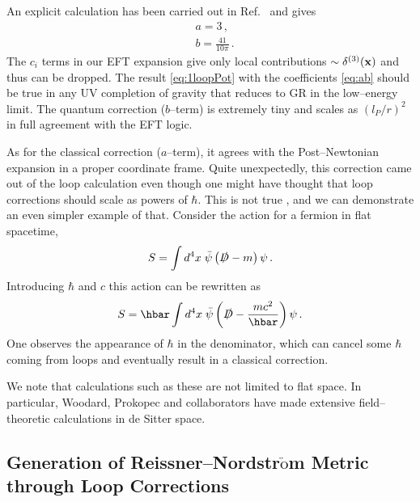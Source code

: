 \documentclass[11pt,a4paper]{article}
\newcommand{\be}{\begin{equation}}
\newcommand{\ee}{\end{equation}}
\begin{document}
An explicit calculation has been carried out in Ref.~\cite{Donoghue:1994dn} and gives
\be
\label{eq:ab}
 \begin{split}
& a=3\,,\\
& b=\frac{41}{10\pi}\,.
\end{split}
\ee
The $c_i$ terms in our EFT expansion give only local contributions $\sim \delta^{(3)}(\bf{x})$
and thus can be dropped.
The result \eqref{eq:1loopPot} with the coefficients \eqref{eq:ab} should be true in any
UV completion of gravity that reduces to GR in the low--energy limit.
The quantum correction ($b$--term) is extremely tiny and scales as
$\left({l_{P}}/{r} \right)^2$
in full agreement with the EFT logic.

As for the classical correction ($a$--term), it agrees with the Post--Newtonian expansion
in a proper coordinate frame.  Quite unexpectedly, this correction came out of the loop calculation
even though one might have thought that loop corrections should scale as powers of $\hbar$.
This is not true \cite{Holstein}, and we can demonstrate an even simpler example of that. Consider
the action for a fermion in flat spacetime,
\be
S=\int d^4x \; \bar \psi \left(\slashed{D}-m\right)\psi\,.
\ee
Introducing $\hbar$ and $c$ this action can be rewritten as
\be
S=\hbar \int d^4x \; \bar \psi \left(\slashed{D}-\frac{mc^2}{\hbar}\right)\psi\,.
\ee
One observes the appearance of $\hbar$ in the denominator, which can cancel some $\hbar$
coming from loops and eventually result in a classical correction.

We note that calculations such as these are not limited to flat space. In particular, Woodard, Prokopec and
collaborators \cite{Woodard:2014jba, Park:2015kua, Glavan} have made extensive field--theoretic calculations in de Sitter space.


\subsection{Generation of Reissner--Nordstr$\ddot{\text{o}}$m Metric through Loop Corrections}
\end{document}
